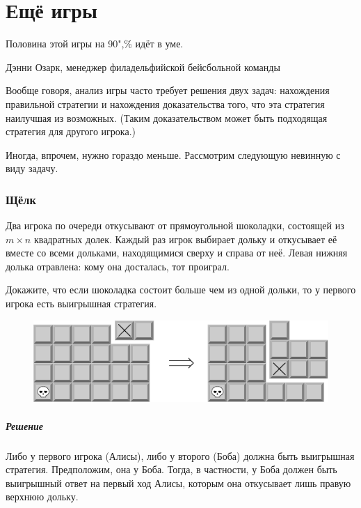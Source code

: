\documentclass[twoside]{book}
\makeatletter
\newcommand{\rindex}[2][\imki@jobname]{%
\index[#1]{\detokenize{#2}}%
}
\makeatother
\begin{document}
\chapter{Ещё игры}

\thispagestyle{empty}


\setlength{\epigraphwidth}{.5\textwidth}
\epigraph{Половина этой игры на 90",\% идёт в уме.\vspace{1ex}}{Дэнни Озарк, менеджер филадельфийской бейсбольной команды} 

Вообще говоря, анализ игры часто требует решения двух задач:
нахождения правильной стратегии и нахождения доказательства того, что
эта стратегия наилучшая из возможных.
(Таким доказательством может
быть подходящая стратегия для другого игрока.)

Иногда, впрочем, нужно гораздо меньше.
Рассмотрим следующую невинную с виду задачу.

\subsection*{Щёлк}%
\rindex{Щёлк}

Два игрока по очереди откусывают от прямоугольной шоколадки, состоящей
из $m \times n$ квадратных долек.
Каждый раз игрок выбирает дольку и
откусывает её вместе со всеми дольками, находящимися сверху и справа
от неё.
Левая нижняя долька отравлена: кому она досталась, тот
проиграл.

Докажите, что если шоколадка состоит больше чем из одной дольки, то у
первого игрока есть выигрышная стратегия. 

\begin{figure}[h]
\centering
\includegraphics{mp/wink-23}
\end{figure}

\paragraph{Решение} Либо у первого игрока (Алисы), либо у второго
(Боба) должна быть выигрышная стратегия. 
Предположим, она у Боба.
Тогда, в частности, у Боба должен быть
выигрышный ответ на первый ход Алисы, которым она откусывает лишь
правую верхнюю дольку.
\end{document}

